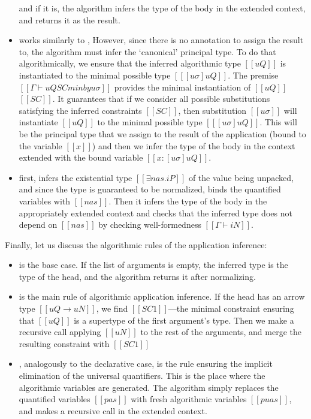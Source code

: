 \documentclass[acmsmall,natbib=false,review,anonymous]{acmart}
\begin{document}
\begin{itemize}
    and if it is, the algorithm infers the type of the body in the extended context,
    and returns it as the result. 
  \item {}
    works similarly to ,
    However, since there is no annotation to assign the result to,
    the algorithm must infer the `canonical' principal type.
    To do that algorithmically, we ensure that 
    the inferred algorithmic type $[[uQ]]$ is instantiated
    to the minimal possible type $[[ [uσ]uQ ]]$.
    The premise $[[Γ ⊢ uQ SC minby uσ]]$
    provides the minimal instantiation of $[[uQ]]$ \wrt $[[SC]]$. It 
    guarantees that if we consider all possible substitutions satisfying the inferred 
    constraints $[[SC]]$, then substitution $[[uσ]]$ will instantiate
    $[[uQ]]$ to the minimal possible type $[[ [uσ]uQ ]]$.
    This will be the principal type that we assign to the result of the application 
    (bound to the variable $[[x]]$)
    and then we infer the type of the body in the context extended with 
    the bound variable $[[x : [uσ]uQ]]$.
  \item {}
    first, infers the existential type $[[∃nas.iP]]$ of the value being unpacked,
    and since the type is guaranteed to be normalized, binds 
    the quantified variables with $[[nas]]$.
    Then it infers the type of the body in the appropriately extended context
    and checks that the inferred type does not depend on $[[nas]]$
    by checking well-formedness $[[Γ ⊢ iN]]$.
\end{itemize}

Finally, let us discuss the algorithmic rules of the application inference:
\begin{itemize}
  \item {}
    is the base case. If the list of arguments is empty, 
    the inferred type is the type of the head,
    and the algorithm returns it after normalizing.
  \item {}
    is the main rule of algorithmic application inference.
    If the head has an arrow type $[[uQ → uN]]$,
    we find $[[SC1]]$---the minimal constraint ensuring that 
    $[[uQ]]$ is a supertype of the first argument's type.
    Then we make a recursive call applying $[[uN]]$ to the rest of the arguments,
    and merge the resulting constraint with $[[SC1]]$
  \item {},
    analogously to the declarative case,
    is the rule ensuring the implicit elimination of the universal quantifiers. 
    This is the place where the algorithmic variables are generated.
    The algorithm simply replaces the quantified variables 
    $[[pas]]$ with fresh algorithmic variables $[[puas]]$,
    and makes a recursive call in the extended context. 
\end{itemize}
\end{document}
